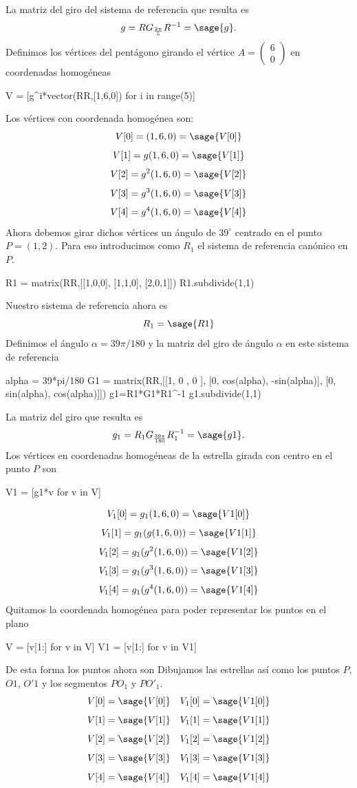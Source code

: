 \documentclass{amsart}
\begin{document}
La matriz del giro del sistema de referencia que resulta es \[g=RG_{\frac{2 \pi}{5}}R^{-1} = \sage{g}.\]
Definimos los vértices del pentágono girando el vértice $A = \left( \begin{array}{r} 6  \\ 0 \end{array} \right)$ en coordenadas homogéneas

\begin{sageblock}
V = [g^i*vector(RR,[1,6,0]) for i in range(5)]
\end{sageblock}
Los vértices con coordenada homogénea son:
$$V[0]=(1,6,0)=\sage{V[0]}$$
$$V[1]=g(1,6,0)=\sage{V[1]}$$
$$V[2]=g^2(1,6,0)=\sage{V[2]}$$
$$V[3]=g^3(1,6,0)=\sage{V[3]}$$
$$V[4]=g^4(1,6,0)=\sage{V[4]}$$
Ahora debemos girar dichos vértices un ángulo de $39^\circ$ centrado en el punto $P = (1,2)$. Para eso introducimos como $R_1$ el sistema de referencia canónico en $P$.

\begin{sageblock}
R1 = matrix(RR,[[1,0,0],
             [1,1,0],
             [2,0,1]])
R1.subdivide(1,1)
\end{sageblock}

Nuestro sistema de referencia ahora es \[ R_1=\sage{R1} \] Definimos el ángulo $\alpha = 39\pi/180$ y la matriz del giro de ángulo $\alpha$ en este sistema de referencia 
\begin{sageblock}
alpha = 39*pi/180
G1 = matrix(RR,[[1, 0        ,  0        ],
            [0, cos(alpha), -sin(alpha)],
            [0, sin(alpha),  cos(alpha)]])
g1=R1*G1*R1^-1
g1.subdivide(1,1)
\end{sageblock}

La matriz del giro que resulta es \[g_1=R_1G_{\frac{39 \pi}{180}}R_1^{-1} = \sage{g1}.\] 
Los vértices en coordenadas homogéneas de la estrella girada con centro en el punto $P$ son

\begin{sageblock}
V1 = [g1*v for v in V]
\end{sageblock}
$$V_1[0]=g_1(1,6,0)=\sage{V1[0]}$$
$$V_1[1]=g_1(g(1,6,0))=\sage{V1[1]}$$
$$V_1[2]=g_1(g^2(1,6,0))=\sage{V1[2]}$$
$$V_1[3]=g_1(g^3(1,6,0))=\sage{V1[3]}$$
$$V_1[4]=g_1(g^4(1,6,0))=\sage{V1[4]}$$
Quitamos la coordenada homogénea para poder representar los puntos en el plano

\begin{sageblock}
V = [v[1:] for v in V]
V1 = [v[1:] for v in V1]
\end{sageblock}
De esta forma los puntos ahora son
Dibujamos las estrellas así como los puntos $P$, $O1$, $O'1$ y los segmentos $PO_1$ y $PO'_1$.
$$V[0]=\sage{V[0]} \quad V_1[0]=\sage{V1[0]}$$
$$V[1]=\sage{V[1]} \quad V_1[1]=\sage{V1[1]}$$
$$V[2]=\sage{V[2]} \quad V_1[2]=\sage{V1[2]}$$
$$V[3]=\sage{V[3]} \quad V_1[3]=\sage{V1[3]}$$
$$V[4]=\sage{V[4]} \quad V_1[4]=\sage{V1[4]}$$
\end{document}

